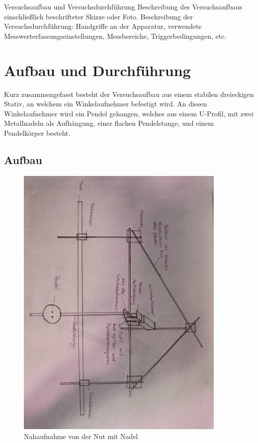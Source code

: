 \documentclass[twoside]{protokoll}
\begin{document}
\begin{aufgabe}{Versuchsaufbau und Versuchsdurchführung}
  Beschreibung des Versuchsaufbaus einschließlich beschrifteter Skizze
  oder Foto. Beschreibung der Versuchsdurchführung: Handgriffe an der
  Apparatur, verwendete Messwerterfassungseinstellungen, Messbereiche,
  Triggerbedingungen, etc.
\end{aufgabe}

\section{Aufbau und Durchführung}
Kurz zusammengefasst besteht der Versuchsaufbau aus einem stabilen dreieckigen Stativ, an welchem ein Winkelaufnehmer befestigt wird.
An diesen Winkelaufnehmer wird ein Pendel gehangen, welches aus einem U-Profil, mit zwei Metallnadeln als Aufhängung, einer flachen Pendelstange, und einem Pendelkörper besteht.\\
\subsection{Aufbau}
\begin{figure}[H]
    \centering
    \includegraphics[width=0.9\textwidth]{Bilder/Kompletter-Aufbau.pdf}
    \caption{Nahaufnahme von der Nut mit Nadel}
\end{figure}
\end{document}
